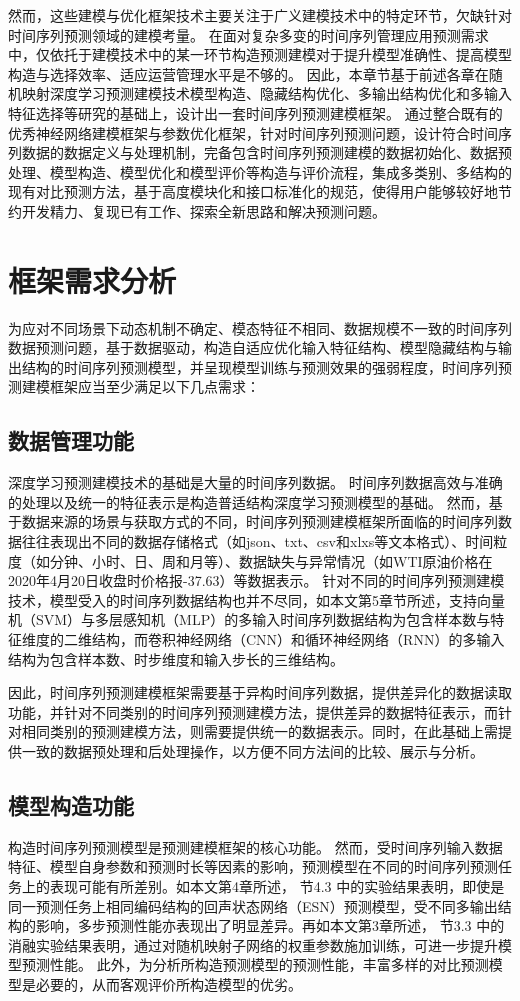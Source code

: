 然而，这些建模与优化框架技术主要关注于广义建模技术中的特定环节，欠缺针对时间序列预测领域的建模考量。
在面对复杂多变的时间序列管理应用预测需求中，仅依托于建模技术中的某一环节构造预测建模对于提升模型准确性、提高模型构造与选择效率、适应运营管理水平是不够的。
因此，本章节基于前述各章在随机映射深度学习预测建模技术模型构造、隐藏结构优化、多输出结构优化和多输入特征选择等研究的基础上，设计出一套时间序列预测建模框架。
通过整合既有的优秀神经网络建模框架与参数优化框架，针对时间序列预测问题，设计符合时间序列数据的数据定义与处理机制，完备包含时间序列预测建模的数据初始化、数据预处理、模型构造、模型优化和模型评价等构造与评价流程，集成多类别、多结构的现有对比预测方法，基于高度模块化和接口标准化的规范，使得用户能够较好地节约开发精力、复现已有工作、探索全新思路和解决预测问题。

\section{框架需求分析}
为应对不同场景下动态机制不确定、模态特征不相同、数据规模不一致的时间序列数据预测问题，基于数据驱动，构造自适应优化输入特征结构、模型隐藏结构与输出结构的时间序列预测模型，并呈现模型训练与预测效果的强弱程度，时间序列预测建模框架应当至少满足以下几点需求：

\subsection{数据管理功能}
深度学习预测建模技术的基础是大量的时间序列数据。
时间序列数据高效与准确的处理以及统一的特征表示是构造普适结构深度学习预测模型的基础。
然而，基于数据来源的场景与获取方式的不同，时间序列预测建模框架所面临的时间序列数据往往表现出不同的数据存储格式（如json、txt、csv和xlxs等文本格式）、时间粒度（如分钟、小时、日、周和月等）、数据缺失与异常情况（如WTI原油价格在2020年4月20日收盘时价格报-37.63）等数据表示。
针对不同的时间序列预测建模技术，模型受入的时间序列数据结构也并不尽同，如本文第5章节所述，支持向量机（SVM）与多层感知机（MLP）的多输入时间序列数据结构为包含样本数与特征维度的二维结构，而卷积神经网络（CNN）和循环神经网络（RNN）的多输入结构为包含样本数、时步维度和输入步长的三维结构。

因此，时间序列预测建模框架需要基于异构时间序列数据，提供差异化的数据读取功能，并针对不同类别的时间序列预测建模方法，提供差异的数据特征表示，而针对相同类别的预测建模方法，则需要提供统一的数据表示。同时，在此基础上需提供一致的数据预处理和后处理操作，以方便不同方法间的比较、展示与分析。

\subsection{模型构造功能}
构造时间序列预测模型是预测建模框架的核心功能。
然而，受时间序列输入数据特征、模型自身参数和预测时长等因素的影响，预测模型在不同的时间序列预测任务上的表现可能有所差别。如本文第4章所述，
节4.3
中的实验结果表明，即使是同一预测任务上相同编码结构的回声状态网络（ESN）预测模型，受不同多输出结构的影响，多步预测性能亦表现出了明显差异。再如本文第3章所述，
节3.3
中的消融实验结果表明，通过对随机映射子网络的权重参数施加训练，可进一步提升模型预测性能。
此外，为分析所构造预测模型的预测性能，丰富多样的对比预测模型是必要的，从而客观评价所构造模型的优劣。

